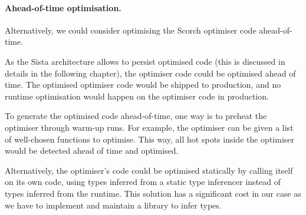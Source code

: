 \documentclass[a4paper,12pt,twoside]{../includes/ThesisStyle}
\begin{document}
\paragraph{Ahead-of-time optimisation.} 
Alternatively, we could consider optimising the Scorch optimiser code ahead-of-time.

As the Sista architecture allows to persist optimised code (this is discussed in details in the following chapter), the optimiser code could be optimised ahead of time. The optimised optimiser code would be shipped to production, and no runtime optimisation would happen on the optimiser code in production.

To generate the optimised code ahead-of-time, one way is to preheat the optimiser through warm-up runs. For example, the optimiser can be given a list of well-chosen functions to optimise. This way, all hot spots inside the optimiser would be detected ahead of time and optimised. 

Alternatively, the optimiser's code could be optimised statically by calling itself on its own code, using types inferred from a static type inferencer instead of types inferred from the runtime. This solution has a significant cost in our case as we have to implement and maintain a library to infer types.




\end{document}
